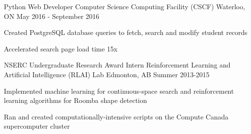 \begin{cventries}

\cventry
{Python Web Developer} %
{Computer Science Computing Facility (CSCF)} %
{Waterloo, ON} %
{May 2016 - September 2016} %
{ %
\begin{cvitems}
\item {Created PostgreSQL database queries to fetch, search and modify student records}
\item {Accelerated search page load time 15x}
\end{cvitems}
}



\cventry
{NSERC Undergraduate Research Award Intern} %
{Reinforcement Learning and Artificial Intelligence (RLAI) Lab} %
{Edmonton, AB} %
{Summer 2013-2015} %
{ %
\begin{cvitems}
\item {Implemented machine learning for continuous-space search and reinforcement learning algorithms for Roomba shape detection}
\item {Ran and created computationally-intensive scripts on the Compute Canada supercomputer cluster}
\end{cvitems}
}

\end{cventries}